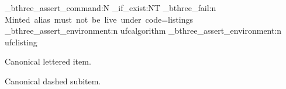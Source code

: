 \documentclass{abntexto-ufc}
\begin{document}
\ExplSyntaxOn
\ufc_bthree_assert_command:N \ufcInputListing
\cs_if_exist:NT \ufcInputMinted
  { \ufc_bthree_fail:n {Minted~alias~must~not~be~live~under~code=listings} }
\ufc_bthree_assert_environment:n {ufcalgorithm}
\ufc_bthree_assert_environment:n {ufclisting}
\ExplSyntaxOff

\begin{ufclettereditems}
  \item Canonical lettered item.
  \begin{ufcdashedsubitems}
    \item Canonical dashed subitem.
  \end{ufcdashedsubitems}
\end{ufclettereditems}

\begin{ufcdefinitionlist}
\end{ufcdefinitionlist}


\end{document}

